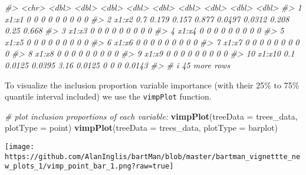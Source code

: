 \documentclass[
]{article}
\newenvironment{Shaded}{\begin{snugshade}}{\end{snugshade}}
\newcommand{\AttributeTok}[1]{\textcolor[rgb]{0.13,0.29,0.53}{#1}}
\newcommand{\CommentTok}[1]{\textcolor[rgb]{0.56,0.35,0.01}{\textit{#1}}}
\newcommand{\FunctionTok}[1]{\textcolor[rgb]{0.13,0.29,0.53}{\textbf{#1}}}
\newcommand{\NormalTok}[1]{#1}
\newcommand{\StringTok}[1]{\textcolor[rgb]{0.31,0.60,0.02}{#1}}
\begin{document}
\begin{Shaded}
\begin{Highlighting}[]
\CommentTok{\#\textgreater{}    \textless{}chr\textgreater{}  \textless{}dbl\textgreater{}    \textless{}dbl\textgreater{}  \textless{}dbl\textgreater{} \textless{}dbl\textgreater{}  \textless{}dbl\textgreater{}  \textless{}dbl\textgreater{}  \textless{}dbl\textgreater{}  \textless{}dbl\textgreater{}    \textless{}dbl\textgreater{}}
\CommentTok{\#\textgreater{}  1 x1:x1    0     0      0      0     0      0       0       0      0     }
\CommentTok{\#\textgreater{}  2 x1:x2    0.7   0.179  0.157  0.877 0.0497 0.0312  0.208   0.25   0.668 }
\CommentTok{\#\textgreater{}  3 x1:x3    0     0      0      0     0      0       0       0      0     }
\CommentTok{\#\textgreater{}  4 x1:x4    0     0      0      0     0      0       0       0      0     }
\CommentTok{\#\textgreater{}  5 x1:x5    0     0      0      0     0      0       0       0      0     }
\CommentTok{\#\textgreater{}  6 x1:x6    0     0      0      0     0      0       0       0      0     }
\CommentTok{\#\textgreater{}  7 x1:x7    0     0      0      0     0      0       0       0      0     }
\CommentTok{\#\textgreater{}  8 x1:x8    0     0      0      0     0      0       0       0      0     }
\CommentTok{\#\textgreater{}  9 x1:x9    0     0      0      0     0      0       0       0      0     }
\CommentTok{\#\textgreater{} 10 x1:x10   0.1   0.0125 0.0395 3.16  0.0125 0       0       0      0.0143}
\CommentTok{\#\textgreater{} \# i 45 more rows}
\end{Highlighting}
\end{Shaded}

To visualize the inclusion proportion variable importance (with their
25\% to 75\% quantile interval included) we use the \texttt{vimpPlot}
function.

\begin{Shaded}
\begin{Highlighting}[]
\CommentTok{\# plot inclusion proportions of each variable:}
\FunctionTok{vimpPlot}\NormalTok{(}\AttributeTok{treeData =}\NormalTok{ trees\_data, }\AttributeTok{plotType =} \StringTok{\textquotesingle{}point\textquotesingle{}}\NormalTok{)}
\FunctionTok{vimpPlot}\NormalTok{(}\AttributeTok{treeData =}\NormalTok{ trees\_data, }\AttributeTok{plotType =} \StringTok{\textquotesingle{}barplot\textquotesingle{}}\NormalTok{)}
\end{Highlighting}
\end{Shaded}

\begin{center}\texttt{[image: https://github.com/AlanInglis/bartMan/blob/master/bartman\_vignettte\_new\_plots\_1/vimp\_point\_bar\_1.png?raw=true]} \end{center}
\end{document}
